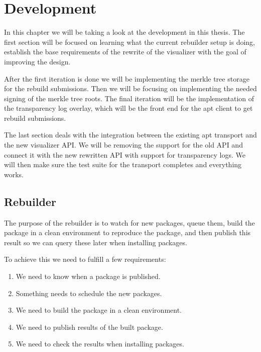 \documentclass[../Main/thesis.tex]{subfiles}
\begin{document}
\chapter{Development}\label{ch:development}
In this chapter we will be taking a look at the development in this thesis. The
first section will be focused on learning what the current rebuilder setup is
doing, establish the base requirements of the rewrite of the visualizer with the
goal of improving the design.

After the first iteration is done we will be implementing the merkle tree
storage for the rebuild submissions. Then we will be focusing on implementing
the needed signing of the merkle tree roots. The final iteration will be the
implementation of the transparency log overlay, which will be the front end for
the apt client to get rebuild submissions.

The last section deals with the integration between the existing apt transport
and the new visualizer API. We will be removing the support for the old API and
connect it with the new rewritten API with support for transparency logs. We
will then make sure the test suite for the transport completes and everything
works.

\section{Rebuilder}\label{sec:development_rebuilders}
The purpose of the rebuilder is to watch for new packages, queue them, build the
package in a clean environment to reproduce the package, and then publish this
result so we can query these later when installing packages.

To achieve this we need to fulfill a few requirements:

\begin{enumerate}
    \item \label{itm:published} We need to know when a package is published.
    \item \label{itm:scheduler} Something needs to schedule the new packages.
    \item \label{itm:builder} We need to build the package in a clean environment.
    \item \label{itm:publish} We need to publish results of the built package.
    \item \label{itm:transport} We need to check the results when installing packages.
\end{enumerate}
\end{document}
